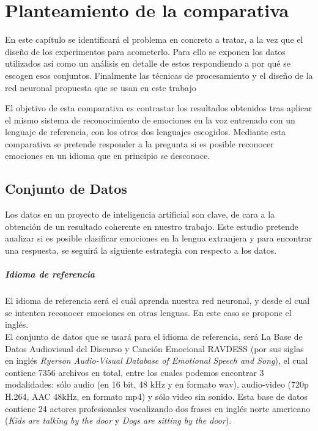 \documentclass[11pt,a4paper,spanish]{book}
\begin{document}
	\chapter{Planteamiento de la comparativa}
	
	En este capítulo se identificará el problema en concreto a tratar, a la vez que el diseño de los experimentos para acometerlo. Para ello se exponen los datos utilizados así como un análisis en detalle de estos respondiendo a por qué se escogen esos conjuntos. Finalmente las técnicas de procesamiento y el diseño de la red neuronal propuesta que se usan en este trabajo
	
	El objetivo de esta comparativa es contrastar los resultados obtenidos tras aplicar el mismo sistema de reconocimiento de emociones en la voz entrenado con un lenguaje de referencia, con los otros dos lenguajes escogidos. Mediante esta comparativa se pretende responder a la pregunta si es posible reconocer emociones en un idioma que en principio se desconoce.
	
	\section{Conjunto de Datos}
	Los datos en un proyecto de inteligencia artificial son clave, de cara a la obtención de un resultado coherente en nuestro trabajo. Este estudio pretende analizar si es posible clasificar emociones en la lengua extranjera y para encontrar una respuesta, se seguirá la siguiente estrategia con respecto a los datos.
	
	\paragraph{Idioma de referencia} El idioma de referencia será el cuál aprenda nuestra red neuronal, y desde el cual se intenten reconocer emociones en otras lenguas. En este caso se propone el inglés.\\
	
	El conjunto de datos que se usará para el idioma de referencia, será La Base de Datos Audiovisual del Discurso y Canción Emocional RAVDESS (por sus siglas en inglés \emph{Ryerson Audio-Visual Database of Emotional Speech and Song}), el cual contiene 7356 archivos en total, entre los cuales podemos encontrar 3 modalidades: sólo audio (en 16 bit, 48 kHz y en formato wav), audio-video (720p H.264, AAC 48kHz, en formato mp4) y sólo video sin sonido. Esta base de datos contiene 24 actores profesionales vocalizando dos frases en inglés norte americano (\emph{Kids are talking by the door} y \emph{Dogs are sitting by the door}).
	
\end{document}
